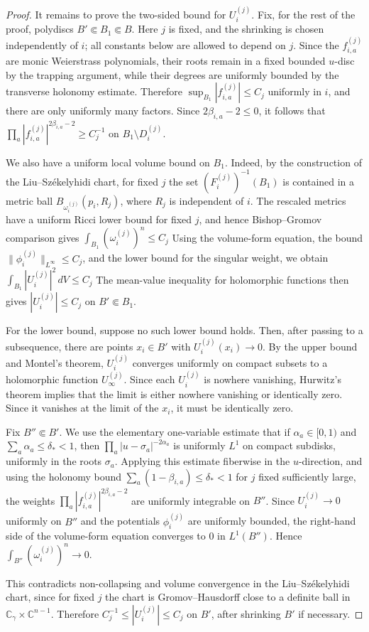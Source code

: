 \documentclass[11pt]{amsart}
\theoremstyle{definition}
\theoremstyle{remark}
\begin{document}
\begin{proof}
It remains to prove the two-sided bound for $U_i^{(j)}$. Fix, for the rest of
the proof, polydiscs $B'\Subset B_1\Subset B$. Here $j$ is fixed, and the
shrinking is chosen independently of $i$; all constants below are allowed to
depend on $j$. Since the $f_{i,a}^{(j)}$ are monic Weierstrass polynomials,
their roots remain in a fixed bounded $u$-disc by the trapping argument, while
their degrees are uniformly bounded by the transverse holonomy estimate.
Therefore $\sup_{B_1}|f_{i,a}^{(j)}|\leq C_j$
uniformly in $i$, and there are only uniformly many factors. Since
$2\beta_{i,a}-2\leq0$, it follows that $\prod_a |f_{i,a}^{(j)}|^{2\beta_{i,a}-2}\geq C_j^{-1}$
on $B_1\setminus D_i^{(j)}$.

We also have a uniform local volume bound on $B_1$. Indeed, by the construction
of the Liu--Sz\'ekelyhidi chart, for fixed $j$ the set
$(F_i^{(j)})^{-1}(B_1)$ is contained in a metric ball
$B_{\omega_i^{(j)}}(p_i,R_j)$, where $R_j$ is independent of $i$. The
rescaled metrics have a uniform Ricci lower bound for fixed $j$, and hence
Bishop--Gromov comparison gives $\int_{B_1}(\omega_i^{(j)})^n\leq C_j$
Using the volume-form equation, the bound
$\|\phi_i^{(j)}\|_{L^\infty}\leq C_j$, and the lower bound for the singular
weight, we obtain $\int_{B_1}|U_i^{(j)}|^2\,dV\leq C_j$
The mean-value inequality for holomorphic functions then gives
$|U_i^{(j)}|\leq C_j$ on $B'\Subset B_1$.

For the lower bound, suppose no such lower bound holds. Then, after passing to a
subsequence, there are points $x_i\in B'$ with $U_i^{(j)}(x_i)\to0$. By the
upper bound and Montel's theorem, $U_i^{(j)}$ converges uniformly on compact
subsets to a holomorphic function $U_\infty^{(j)}$. Since each $U_i^{(j)}$ is
nowhere vanishing, Hurwitz's theorem implies that the limit is either nowhere
vanishing or identically zero. Since it vanishes at the limit of the $x_i$, it
must be identically zero.

Fix $B''\Subset B'$. We use the elementary one-variable estimate that if
$\alpha_a\in[0,1)$ and $\sum_a\alpha_a\leq\delta_*<1$, then
$\prod_a |u-\sigma_a|^{-2\alpha_a}$ is uniformly $L^1$ on compact subdisks,
uniformly in the roots $\sigma_a$. Applying this estimate fiberwise in the
$u$-direction, and using the holonomy bound
$\sum_a(1-\beta_{i,a})\leq\delta_*<1$ for $j$ fixed sufficiently large, the
weights $\prod_a |f_{i,a}^{(j)}|^{2\beta_{i,a}-2}$ are uniformly integrable on
$B''$. Since $U_i^{(j)}\to0$ uniformly on $B''$ and the potentials
$\phi_i^{(j)}$ are uniformly bounded, the right-hand side of the volume-form
equation converges to $0$ in $L^1(B'')$. Hence
$\int_{B''}(\omega_i^{(j)})^n\to0$.

This contradicts non-collapsing and volume convergence in the Liu--Sz\'ekelyhidi chart, since
for fixed $j$ the chart is Gromov--Hausdorff close to a definite ball in
$\mathbb C_\gamma\times\mathbb C^{n-1}$. Therefore
$C_j^{-1}\leq |U_i^{(j)}|\leq C_j$ on $B'$, after shrinking $B'$ if necessary.
\end{proof}
\end{document}
